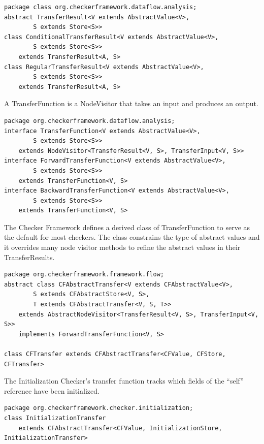 \begin{verbatim}
package class org.checkerframework.dataflow.analysis;
abstract TransferResult<V extends AbstractValue<V>,
        S extends Store<S>>
class ConditionalTransferResult<V extends AbstractValue<V>,
        S extends Store<S>>
    extends TransferResult<A, S>
class RegularTransferResult<V extends AbstractValue<V>,
        S extends Store<S>>
    extends TransferResult<A, S>
\end{verbatim}

\label{sec:transfer_function_classes}

A TransferFunction is a NodeVisitor that takes an input and produces an output.

\begin{verbatim}
package org.checkerframework.dataflow.analysis;
interface TransferFunction<V extends AbstractValue<V>,
        S extends Store<S>>
    extends NodeVisitor<TransferResult<V, S>, TransferInput<V, S>>
interface ForwardTransferFunction<V extends AbstractValue<V>,
        S extends Store<S>>
    extends TransferFunction<V, S>
interface BackwardTransferFunction<V extends AbstractValue<V>,
        S extends Store<S>>
    extends TransferFunction<V, S>
\end{verbatim}

The Checker Framework defines a derived class of TransferFunction to
serve as the default for most checkers.  The class constrains the type
of abstract values and it overrides many node visitor methods to
refine the abstract values in their TransferResults.

\begin{verbatim}
package org.checkerframework.framework.flow;
abstract class CFAbstractTransfer<V extends CFAbstractValue<V>,
        S extends CFAbstractStore<V, S>,
        T extends CFAbstractTransfer<V, S, T>>
    extends AbstractNodeVisitor<TransferResult<V, S>, TransferInput<V, S>>
    implements ForwardTransferFunction<V, S>

class CFTransfer extends CFAbstractTransfer<CFValue, CFStore, CFTransfer>
\end{verbatim}

The Initialization Checker's transfer function tracks which fields of
the ``self'' reference have been initialized.

\begin{verbatim}
package org.checkerframework.checker.initialization;
class InitializationTransfer
    extends CFAbstractTransfer<CFValue, InitializationStore, InitializationTransfer>
\end{verbatim}

